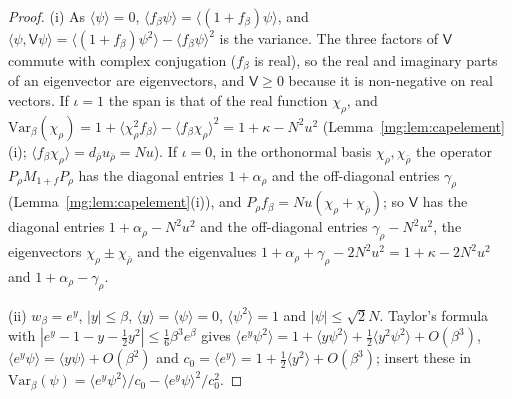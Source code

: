 \documentclass[11pt,a4paper]{article}
\theoremstyle{definition}
\theoremstyle{remark}
\newcommand{\ip}[2]{\langle #1,#2\rangle}
\begin{document}
\begin{proof}
(i) As $\langle\psi\rangle=0$, $\langle f_\beta\psi\rangle=\langle(1+f_\beta)\psi\rangle$, and $\ip\psi{\mathsf V\psi}=\langle(1+f_\beta)\psi^2\rangle-\langle f_\beta\psi\rangle^2$ is the
variance. The three factors of $\mathsf V$ commute with complex conjugation ($f_\beta$ is real), so the real and imaginary parts of an eigenvector are
eigenvectors, and $\mathsf V\ge0$ because it is non-negative on real vectors. If $\iota=1$ the span is that of the real function $\chi_\rho$, and
$\mathrm{Var}_\beta(\chi_\rho)=1+\langle\chi_\rho^2f_\beta\rangle-\langle f_\beta\chi_\rho\rangle^2=1+\kappa-N^2u^2$ (Lemma~\ref{mg:lem:capelement}(i); $\langle f_\beta\chi_\rho\rangle=d_{\bar\rho}u_{\bar\rho}=Nu$).
If $\iota=0$, in the orthonormal basis $\chi_\rho,\chi_{\bar\rho}$ the operator $P_\rho M_{1+f}P_\rho$ has the diagonal entries $1+\alpha_\rho$ and the
off-diagonal entries $\gamma_\rho$ (Lemma~\ref{mg:lem:capelement}(i)), and $P_\rho f_\beta=Nu(\chi_\rho+\chi_{\bar\rho})$; so $\mathsf V$ has the diagonal entries
$1+\alpha_\rho-N^2u^2$ and the off-diagonal entries $\gamma_\rho-N^2u^2$, the eigenvectors $\chi_\rho\pm\chi_{\bar\rho}$ and the eigenvalues
$1+\alpha_\rho+\gamma_\rho-2N^2u^2=1+\kappa-2N^2u^2$ and $1+\alpha_\rho-\gamma_\rho$.

(ii) $w_\beta=e^y$, $|y|\le\beta$, $\langle y\rangle=\langle\psi\rangle=0$, $\langle\psi^2\rangle=1$ and $|\psi|\le\sqrt2N$. Taylor's formula with $|e^y-1-y-\frac12y^2|\le\frac16\beta^3e^\beta$ gives
$\langle e^y\psi^2\rangle=1+\langle y\psi^2\rangle+\frac12\langle y^2\psi^2\rangle+O(\beta^3)$, $\langle e^y\psi\rangle=\langle y\psi\rangle+O(\beta^2)$ and
$c_0=\langle e^y\rangle=1+\frac12\langle y^2\rangle+O(\beta^3)$; insert these in $\mathrm{Var}_\beta(\psi)=\langle e^y\psi^2\rangle/c_0-\langle e^y\psi\rangle^2/c_0^2$.


\end{proof}
\end{document}
